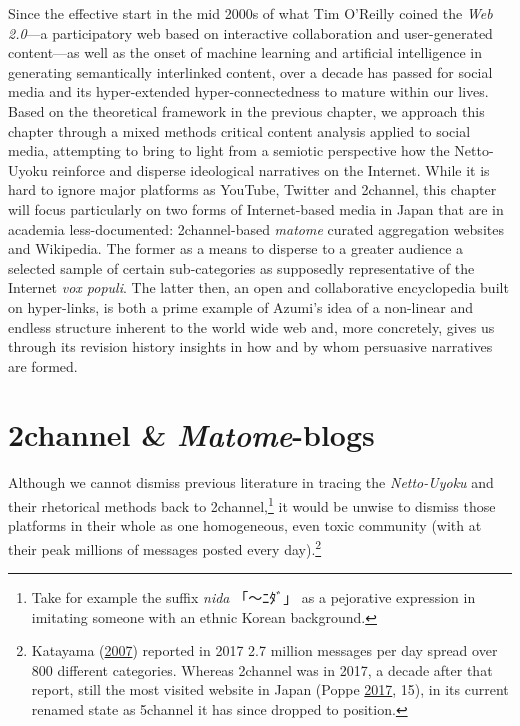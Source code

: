 \documentclass[10pt,british,A4paper,oneside]{memoir}
\begin{document}
Since the effective start in the mid 2000s of what Tim O'Reilly coined
the \emph{Web 2.0}---a participatory web based on interactive
collaboration and user-generated content---as well as the onset of
machine learning and artificial intelligence in generating semantically
interlinked content, over a decade has passed for social media and its
hyper-extended hyper-connectedness to mature within our lives.
Based on the theoretical framework in the previous chapter, we approach
this chapter through a mixed methods critical content analysis applied
to social media, attempting to bring to light from a semiotic
perspective how the Netto-Uyoku reinforce and disperse ideological
narratives on the Internet. While it is hard to ignore major platforms
as YouTube, Twitter and 2channel, this chapter will focus particularly
on two forms of Internet-based media in Japan that are in academia
less-documented: 2channel-based \emph{matome} curated aggregation
websites and Wikipedia. The former as a means to disperse to a greater
audience a selected sample of certain sub-categories as supposedly
representative of the Internet \emph{vox populi}. The latter then, an
open and collaborative encyclopedia built on hyper-links, is both a
prime example of Azumi's idea of a non-linear and endless structure
inherent to the world wide web and, more concretely, gives us through
its revision history insights in how and by whom persuasive narratives
are formed.

\section{\texorpdfstring{2channel \&
\emph{Matome}-blogs}{2channel \& Matome-blogs}}\label{channel-matome-blogs}

Although we cannot dismiss previous literature in tracing the
\emph{Netto-Uyoku} and their rhetorical methods back to
2channel,\footnote{Take for example the suffix \emph{nida} 「～ﾆﾀﾞ」 as
  a pejorative expression in imitating someone with an ethnic Korean
  background.} it would be unwise to dismiss those platforms in their
whole as one homogeneous, even toxic community (with at their peak
millions of messages posted every day).\footnote{Katayama
  (\protect\hyperlink{ref-katayama_2-channel_2007}{2007}) reported in
  2017 2.7 million messages per day spread over 800 different
  categories. Whereas 2channel was in 2017, a decade after that report,
  still the  most visited website in Japan (Poppe
  \protect\hyperlink{ref-poppe_digitaal_2017}{2017}, 15), in its current
  renamed state as 5channel it has since dropped to  position.}
\end{document}
